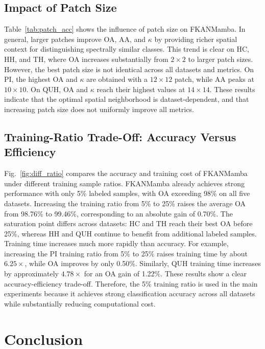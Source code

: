 \documentclass{ieeeaccess}
\begin{document}
\subsection{Impact of Patch Size}
Table~\ref{tab:patch_acc} shows the influence of patch size on FKANMamba. In general, larger patches improve OA, AA, and $\kappa$ by providing richer spatial context for distinguishing spectrally similar classes. This trend is clear on HC, HH, and TH, where OA increases substantially from $2\times2$ to larger patch sizes. However, the best patch size is not identical across all datasets and metrics. On PI, the highest OA and $\kappa$ are obtained with a $12\times12$ patch, while AA peaks at $10\times10$. On QUH, OA and $\kappa$ reach their highest values at $14\times14$. These results indicate that the optimal spatial neighborhood is dataset-dependent, and that increasing patch size does not uniformly improve all metrics.

\subsection{Training-Ratio Trade-Off: Accuracy Versus Efficiency}

Fig.~\ref{fig:diff_ratio} compares the accuracy and training cost of FKANMamba under different training sample ratios. FKANMamba already achieves strong performance with only 5\% labeled samples, with OA exceeding 98\% on all five datasets. Increasing the training ratio from 5\% to 25\% raises the average OA from 98.76\% to 99.46\%, corresponding to an absolute gain of 0.70\%. The saturation point differs across datasets: HC and TH reach their best OA before 25\%, whereas HH and QUH continue to benefit from additional labeled samples. Training time increases much more rapidly than accuracy. For example, increasing the PI training ratio from 5\% to 25\% raises training time by about \(6.25\times\), while OA improves by only 0.50\%. Similarly, QUH training time increases by approximately \(4.78\times\) for an OA gain of 1.22\%. These results show a clear accuracy-efficiency trade-off. Therefore, the 5\% training ratio is used in the main experiments because it achieves strong classification accuracy across all datasets while substantially reducing computational cost.

\section{Conclusion}
\label{sec:conclusion}
\end{document}

